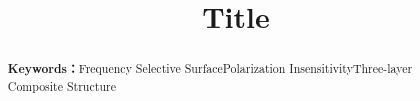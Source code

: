 \documentclass[withoutpreface,bwprint]{cumcmthesis}
\title{Title}
\begin{document}
 \maketitle
\renewcommand{\abstractname}{Abstract}
\renewcommand{\keywords}{\textbf{Keywords：}}
\begin{abstract}
\begin{spacing}{1.6}

\end{spacing}
\noindent\keywords{Frequency Selective Surface\quad Polarization Insensitivity\quad Three-layer Composite Structure}
\end{abstract}



 


%

\newpage
\begin{thebibliography}{99}
\end{thebibliography}

%
%
%

\newpage

\end{document}
